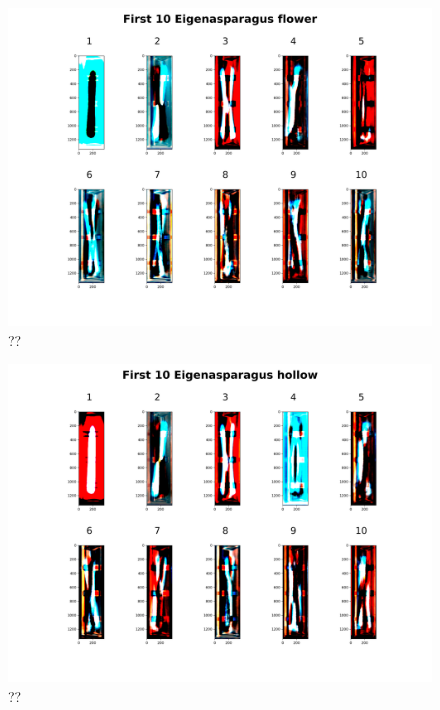 \begin{figure}[H]
	\centering
	\includegraphics[scale=0.09]{Figures/chapter04/pc_blume}
	\decoRule
	\caption[??]{??}
	\label{fig:PrincipalComponentBlume}
\end{figure}


\begin{figure}[H]
	\centering
	\includegraphics[scale=0.09]{Figures/chapter04/pc_hollow}
	\decoRule
	\caption[??]{??}
	\label{fig:PrincipalComponentHollow}
\end{figure}


